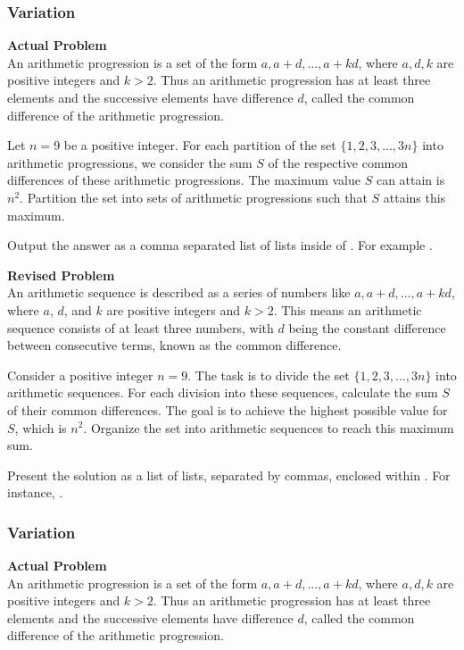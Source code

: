 \subsubsection{Variation}
\textbf{Actual Problem}\\
An arithmetic progression is a set of the form ${a, a+d, . . . , a+kd}$, where $a, d, k$ are positive integers and $k > 2$. Thus an arithmetic progression has at least three elements and the successive elements have difference $d$, called the common difference of the arithmetic progression.

Let $n = 9$ be a positive integer. For each partition of the set $\{1, 2, 3, ..., 3n\}$ into arithmetic progressions, we consider the sum $S$ of the respective common differences of these arithmetic progressions. The maximum value $S$ can attain is $n^2$. Partition the set into sets of arithmetic progressions such that $S$ attains this maximum.

Output the answer as a comma separated list of lists inside of . For example .

\textbf{Revised Problem}\\
An arithmetic sequence is described as a series of numbers like \({a, a+d, \ldots, a+kd}\), where \(a\), \(d\), and \(k\) are positive integers and \(k > 2\). This means an arithmetic sequence consists of at least three numbers, with \(d\) being the constant difference between consecutive terms, known as the common difference.

Consider a positive integer \(n = 9\). The task is to divide the set \(\{1, 2, 3, \ldots, 3n\}\) into arithmetic sequences. For each division into these sequences, calculate the sum \(S\) of their common differences. The goal is to achieve the highest possible value for \(S\), which is \(n^2\). Organize the set into arithmetic sequences to reach this maximum sum.

Present the solution as a list of lists, separated by commas, enclosed within . For instance, .

\subsubsection{Variation}
\textbf{Actual Problem}\\
An arithmetic progression is a set of the form ${a, a+d, . . . , a+kd}$, where $a, d, k$ are positive integers and $k > 2$. Thus an arithmetic progression has at least three elements and the successive elements have difference $d$, called the common difference of the arithmetic progression.

